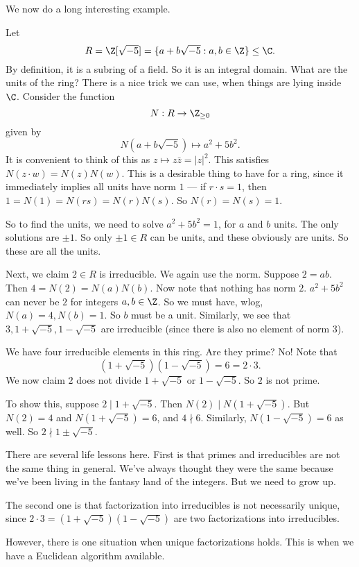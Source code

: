 \documentclass[a4paper]{article}
\begin{document}
We now do a long interesting example.
\begin{eg}
  Let
  \[
    R = \Z[\sqrt{-5}] = \{a + b\sqrt{-5}: a, b\in \Z\} \leq \C.
  \]
  By definition, it is a subring of a field. So it is an integral domain. What are the units of the ring? There is a nice trick we can use, when things are lying inside $\C$. Consider the function
  \[
    N: R \to \Z_{\geq 0}
  \]
  given by
  \[
    N(a + b\sqrt{-5}) \mapsto a^2 + 5b^2.
  \]
  It is convenient to think of this as $z \mapsto z\bar{z} = |z|^2$. This satisfies $N(z \cdot w) = N(z) N(w)$. This is a desirable thing to have for a ring, since it immediately implies all units have norm $1$ --- if $r \cdot s = 1$, then $1 = N(1) = N(rs) = N(r)N(s)$. So $N(r)=N(s) = 1$.

  So to find the units, we need to solve $a^2 + 5b^2 = 1$, for $a$ and $b$ units. The only solutions are $\pm 1$. So only $\pm 1 \in R$ can be units, and these obviously are units. So these are all the units.

  Next, we claim $2 \in R$ is irreducible. We again use the norm. Suppose $2 = ab$. Then $4 = N(2) = N(a)N(b)$. Now note that nothing has norm $2$. $a^2 + 5b^2$ can never be $2$ for integers $a, b \in \Z$. So we must have, wlog, $N(a) = 4, N(b) = 1$. So $b$ must be a unit. Similarly, we see that $3, 1 + \sqrt{-5}, 1 - \sqrt{-5}$ are irreducible (since there is also no element of norm $3$).

  We have four irreducible elements in this ring. Are they prime? No! Note that
  \[
    (1 + \sqrt{-5})(1 - \sqrt{-5}) = 6 = 2\cdot 3.
  \]
  We now claim $2$ does not divide $1 + \sqrt{-5}$ or $1 - \sqrt{-5}$. So $2$ is not prime.

  To show this, suppose $2 \mid 1 + \sqrt{-5}$. Then $N(2) \mid N(1 + \sqrt{-5})$. But $N(2) = 4$ and $N(1 + \sqrt{-5}) = 6$, and $4 \nmid 6$. Similarly, $N(1 - \sqrt{-5}) = 6$ as well. So $2 \nmid 1 \pm \sqrt{-5}$.
\end{eg}
There are several life lessons here. First is that primes and irreducibles are not the same thing in general. We've always thought they were the same because we've been living in the fantasy land of the integers. But we need to grow up.

The second one is that factorization into irreducibles is not necessarily unique, since $2\cdot 3 = (1 + \sqrt{-5})(1 - \sqrt{-5})$ are two factorizations into irreducibles.

However, there is one situation when unique factorizations holds. This is when we have a Euclidean algorithm available.
\end{document}
